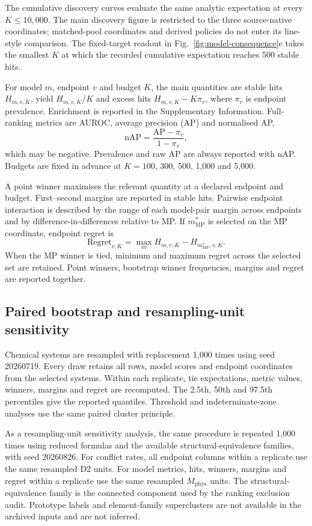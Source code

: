 \documentclass[twoside,twocolumn,9pt]{article}
\begin{document}
The cumulative discovery curves evaluate the same analytic expectation at every $K\leq10{,}000$. The main discovery figure is restricted to the three source-native coordinates; matched-pool coordinates and derived policies do not enter its line-style comparison. The fixed-target readout in Fig.~\ref{fig:model-consequence}e takes the smallest $K$ at which the recorded cumulative expectation reaches 500 stable hits.

For model $m$, endpoint $v$ and budget $K$, the main quantities are stable hits $H_{m,v,K}$, yield $H_{m,v,K}/K$ and excess hits $H_{m,v,K}-K\pi_v$, where $\pi_v$ is endpoint prevalence. Enrichment is reported in the Supplementary Information. Full-ranking metrics are AUROC, average precision (AP) and normalised AP,
\[
\mathrm{nAP}=\frac{\mathrm{AP}-\pi_v}{1-\pi_v},
\]
which may be negative. Prevalence and raw AP are always reported with nAP. Budgets are fixed in advance at $K=100$, 300, 500, 1,000 and 5,000.

A point winner maximises the relevant quantity at a declared endpoint and budget. First--second margins are reported in stable hits. Pairwise endpoint interaction is described by the range of each model-pair margin across endpoints and by difference-in-differences relative to MP. If $m^*_{\mathrm{MP}}$ is selected on the MP coordinate, endpoint regret is
\[
\mathrm{Regret}_{v,K}=\max_m H_{m,v,K}-H_{m^*_{\mathrm{MP}},v,K}.
\]
When the MP winner is tied, minimum and maximum regret across the selected set are retained. Point winners, bootstrap winner frequencies, margins and regret are reported together.

\subsection{Paired bootstrap and resampling-unit sensitivity}

Chemical systems are resampled with replacement 1,000 times using seed 20260719. Every draw retains all rows, model scores and endpoint coordinates from the selected systems. Within each replicate, tie expectations, metric values, winners, margins and regret are recomputed. The 2.5th, 50th and 97.5th percentiles give the reported quantiles. Threshold and indeterminate-zone analyses use the same paired cluster principle.

As a resampling-unit sensitivity analysis, the same procedure is repeated 1,000 times using reduced formulas and the available structural-equivalence families, with seed 20260826. For conflict rates, all endpoint columns within a replicate use the same resampled D2 units. For model metrics, hits, winners, margins and regret within a replicate use the same resampled $M_{\mathrm{phys}}$ units. The structural-equivalence family is the connected component used by the ranking exclusion audit. Prototype labels and element-family superclusters are not available in the archived inputs and are not inferred.
\end{document}
